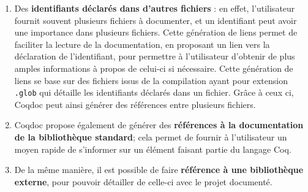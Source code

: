 \documentclass[a4paper, 11pt]{report}
\begin{document}
\begin{itemize}
\begin{enumerate}
          \item Des \textbf{identifiants déclarés dans d'autres fichiers} : en
            effet,
            l'utilisateur fournit souvent plusieurs fichiers à documenter, et
            un identifiant peut avoir une importance dans plusieurs fichiers.
            Cette génération de liens permet de faciliter la lecture de la
            documentation, en proposant un lien vers la déclaration de
            l'identifiant, pour permettre à l'utilisateur d'obtenir de plus
            amples informations à propos de celui-ci si nécessaire.
            Cette génération de liens se base sur des fichiers issus de la
            compilation ayant pour extension \texttt{.glob} qui détaille les
            identifiants déclarés dans un fichier. Grâce à ceux ci, Coqdoc peut
            ainsi générer des références entre plusieurs fichiers.
          \item Coqdoc propose également de générer des \textbf{références à
            la documentation de la bibliothèque standard}; cela permet de
            fournir à l'utilisateur un moyen rapide de s'informer sur un
            élément faisant partie du langage Coq.
          \item De la même manière, il est possible de faire \textbf{référence
            à une bibliothèque externe}, pour pouvoir détailler de celle-ci
            avec le projet documenté.
        \end{enumerate}
    \end{itemize}
\end{document}
